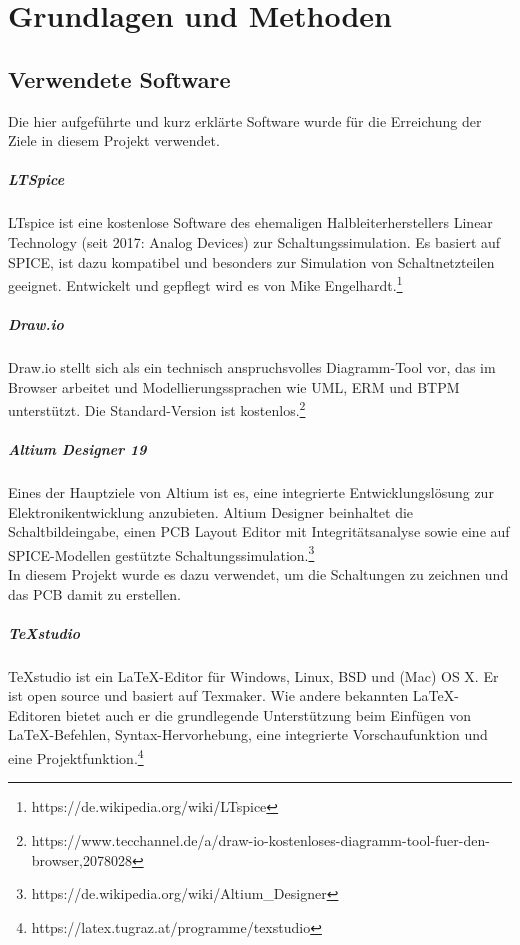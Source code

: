 \documentclass[paper=a4, 12pt]{scrreprt}
\begin{document}
\chapter{Grundlagen und Methoden}\hfill \break
	\section{Verwendete Software}\hfill \break
	Die hier aufgeführte und kurz erklärte Software wurde für die Erreichung der Ziele in diesem Projekt verwendet.
	
	\paragraph{LTSpice}\hfill \break
	LTspice ist eine kostenlose Software des ehemaligen Halbleiterherstellers Linear Technology (seit 2017: Analog Devices) zur Schaltungssimulation. Es basiert auf SPICE, ist dazu kompatibel und besonders zur Simulation von Schaltnetzteilen geeignet. Entwickelt und gepflegt wird es von Mike Engelhardt.\footnote{https://de.wikipedia.org/wiki/LTspice}
	\paragraph{Draw.io}\hfill \break
	Draw.io stellt sich als ein technisch anspruchsvolles Diagramm-Tool vor, das im Browser arbeitet und Modellierungssprachen wie UML, ERM und BTPM unterstützt. Die Standard-Version ist kostenlos.\footnote{https://www.tecchannel.de/a/draw-io-kostenloses-diagramm-tool-fuer-den-browser,2078028}
	\paragraph{Altium Designer 19}\hfill \break
	Eines der Hauptziele von Altium ist es, eine integrierte Entwicklungslösung zur Elektronikentwicklung anzubieten.
	Altium Designer beinhaltet die Schaltbildeingabe, einen PCB Layout Editor mit Integritätsanalyse sowie eine auf SPICE-Modellen gestützte Schaltungssimulation.\footnote{https://de.wikipedia.org/wiki/Altium\_Designer}\\
	In diesem Projekt wurde es dazu verwendet, um die Schaltungen zu zeichnen und das PCB damit zu erstellen.
	\paragraph{TeXstudio}\hfill \break
	TeXstudio ist ein LaTeX-Editor für Windows, Linux, BSD und (Mac) OS X. Er ist open source und basiert auf Texmaker. Wie andere bekannten LaTeX-Editoren bietet auch er die grundlegende Unterstützung beim Einfügen von LaTeX-Befehlen, Syntax-Hervorhebung, eine integrierte Vorschaufunktion und eine Projektfunktion.\footnote{https://latex.tugraz.at/programme/texstudio}
\end{document}
